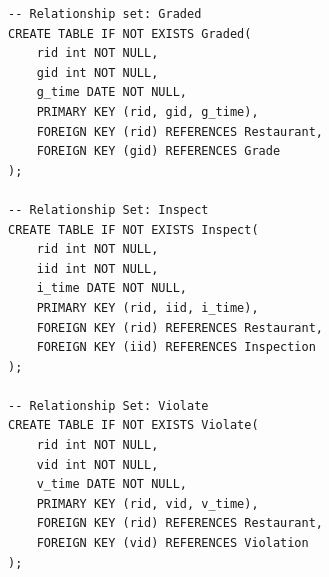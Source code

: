 \documentclass[a4paper,12pt]{article}
\theoremstyle{definition}
\begin{document}
\begin{verbatim}
-- Relationship set: Graded
CREATE TABLE IF NOT EXISTS Graded(
    rid int NOT NULL,
    gid int NOT NULL,
    g_time DATE NOT NULL,
    PRIMARY KEY (rid, gid, g_time),
    FOREIGN KEY (rid) REFERENCES Restaurant,
    FOREIGN KEY (gid) REFERENCES Grade
);

-- Relationship Set: Inspect
CREATE TABLE IF NOT EXISTS Inspect(
    rid int NOT NULL,
    iid int NOT NULL,
    i_time DATE NOT NULL,
    PRIMARY KEY (rid, iid, i_time),
    FOREIGN KEY (rid) REFERENCES Restaurant,
    FOREIGN KEY (iid) REFERENCES Inspection
);

-- Relationship Set: Violate
CREATE TABLE IF NOT EXISTS Violate(
    rid int NOT NULL,
    vid int NOT NULL,
    v_time DATE NOT NULL,
    PRIMARY KEY (rid, vid, v_time),
    FOREIGN KEY (rid) REFERENCES Restaurant,
    FOREIGN KEY (vid) REFERENCES Violation
);
\end{verbatim}
\end{document}

